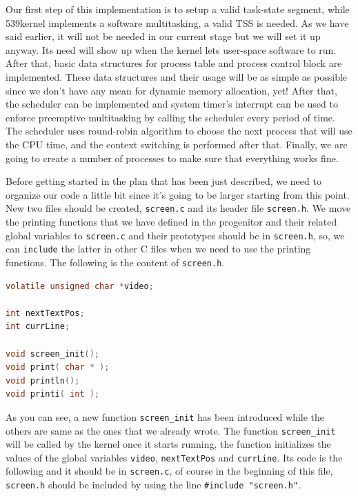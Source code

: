 Our first step of this implementation is to setup a valid task-state
segment, while 539kernel implements a software multitasking, a valid TSS
is needed. As we have said earlier, it will not be needed in our current
stage but we will set it up anyway. Its need will show up when the
kernel lets user-space software to run. After that, basic data
structures for process table and process control block are implemented.
These data structures and their usage will be as simple as possible
since we don't have any mean for dynamic memory allocation, yet! After
that, the scheduler can be implemented and system timer's interrupt can
be used to enforce preemptive multitasking by calling the scheduler
every period of time. The scheduler uses round-robin algorithm to choose
the next process that will use the CPU time, and the context switching
is performed after that. Finally, we are going to create a number of
processes to make sure that everything works fine.

Before getting started in the plan that has been just described, we need
to organize our code a little bit since it's going to be larger starting
from this point. New two files should be created, \lstinline!screen.c!
and its header file \lstinline!screen.h!. We move the printing functions
that we have defined in the progenitor and their related global
variables to \lstinline!screen.c! and their prototypes should be in
\lstinline!screen.h!, so, we can \lstinline!include! the latter in other
C files when we need to use the printing functions. The following is the
content of \lstinline!screen.h!.

\begin{lstlisting}[language=C]
volatile unsigned char *video;

int nextTextPos;
int currLine;

void screen_init();
void print( char * );
void println();
void printi( int );
\end{lstlisting}

As you can see, a new function \lstinline!screen_init! has been
introduced while the others are same as the ones that we already wrote.
The function \lstinline!screen_init! will be called by the kernel once
it starts running, the function initializes the values of the global
variables \lstinline!video!, \lstinline!nextTextPos! and
\lstinline!currLine!. Its code is the following and it should be in
\lstinline!screen.c!, of course in the beginning of this file,
\lstinline!screen.h! should be included by using the line
\lstinline!#include "screen.h"!.

